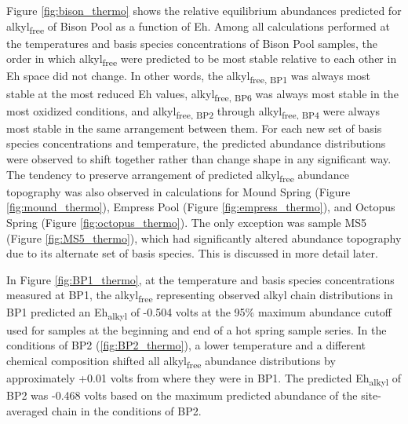 Figure \ref{fig:bison_thermo} shows the relative equilibrium abundances predicted for alkyl\textsubscript{free} of Bison Pool as a function of Eh. Among all calculations performed at the temperatures and basis species concentrations of Bison Pool samples, the order in which alkyl\textsubscript{free} were predicted to be most stable relative to each other in Eh space did not change. In other words, the alkyl\textsubscript{free, BP1} was always most stable at the most reduced Eh values, alkyl\textsubscript{free, BP6} was always most stable in the most oxidized conditions, and alkyl\textsubscript{free, BP2} through alkyl\textsubscript{free, BP4} were always most stable in the same arrangement between them. For each new set of basis species concentrations and temperature, the predicted abundance distributions were observed to shift together rather than change shape in any significant way. The tendency to preserve arrangement of predicted alkyl\textsubscript{free} abundance topography was also observed in calculations for Mound Spring (Figure \ref{fig:mound_thermo}), Empress Pool (Figure \ref{fig:empress_thermo}), and Octopus Spring (Figure \ref{fig:octopus_thermo}). The only exception was sample MS5 (Figure \ref{fig:MS5_thermo}), which had significantly altered abundance topography due to its alternate set of basis species. This is discussed in more detail later.


In Figure \ref{fig:BP1_thermo}, at the temperature and basis species concentrations measured at BP1, the alkyl\textsubscript{free} representing observed alkyl chain distributions in BP1 predicted an Eh\textsubscript{alkyl} of -0.504 volts at the 95\% maximum abundance cutoff used for samples at the beginning and end of a hot spring sample series. In the conditions of BP2 (\ref{fig:BP2_thermo}), a lower temperature and a different chemical composition shifted all alkyl\textsubscript{free} abundance distributions by approximately +0.01 volts from where they were in BP1. The predicted Eh\textsubscript{alkyl} of BP2 was -0.468 volts based on the maximum predicted abundance of the site-averaged chain in the conditions of BP2.

